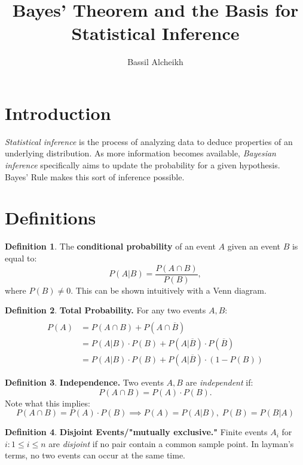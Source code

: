 \documentclass[a4paper]{article}
\title{Bayes' Theorem and the Basis for Statistical Inference}
\author{Bassil Alcheikh}
\theoremstyle{definition}
\newtheorem{defn}{Definition}[section]
\begin{document}
\maketitle

\section{Introduction}
\textit{Statistical inference} is the process of analyzing data to deduce properties of an underlying distribution. As more information becomes available, \textit{Bayesian inference} specifically aims to update the probability for a given hypothesis. Bayes' Rule makes this sort of inference possible. 
\section{Definitions}

\begin{defn} %
The \textbf{conditional probability} of an event $A$ given an event $B$ is equal to:
$$P(A|B) = \frac{P(A \cap B)}{P(B)},$$
where $P(B) \neq 0$. This can be shown intuitively with a Venn diagram.
\end{defn}
\bigbreak
\begin{defn} %
\textbf{Total Probability.} For any two events $A, B$:
\begin{align*} 
\\P(A) &= P(A \cap B)+P(A\cap\overline{B})
\\{} &= P(A|B)\cdot P(B) + P(A|\overline{B})\cdot P(\overline{B})
\\{} &= P(A|B)\cdot P(B) + P(A|\overline{B})\cdot (1-P(B))
\end{align*} 
\end{defn}
\bigbreak
\begin{defn} %
\textbf{Independence.} Two events $A, B$ are \textit{independent} if: 
$$P(A\cap B) = P(A) \cdot P(B).$$
Note what this implies: 
$$P(A\cap B) = P(A) \cdot P(B) \implies P(A) = P(A|B), \; P(B) = P(B|A)$$
\end{defn}
\bigbreak
\begin{defn} %
\textbf{Disjoint Events/"mutually exclusive."} Finite events $A_i$ for $i: 1 \leq i \leq n$ are \textit{disjoint} if no pair contain a common sample point. In layman's terms, no two events can occur at the same time.
\end{defn}
\end{document}
